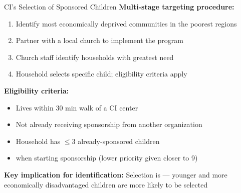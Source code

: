 \documentclass[aspectratio=169, 10pt]{beamer}
\begin{document}
\begin{frame}{CI's Selection of Sponsored Children}
  \textbf{Multi-stage targeting procedure:}
  \begin{enumerate}
    \item Identify most economically deprived communities in the poorest regions
    \item Partner with a local church to implement the program
    \item Church staff identify households with greatest need
    \item Household selects specific child; eligibility criteria apply
  \end{enumerate}
  \vspace{0.5em}
  \textbf{Eligibility criteria:}
  \begin{itemize}
    \item Lives within 30 min walk of a CI center
    \item Not already receiving sponsorship from another organization
    \item Household has $\leq$3 already-sponsored children
    \item {} when starting sponsorship (lower priority given closer to 9)
  \end{itemize}
  \vspace{0.3em}
  \begin{keybox}
    \textbf{Key implication for identification:} Selection is  — younger and more economically disadvantaged children are more likely to be selected
  \end{keybox}
\end{frame}
\end{document}
